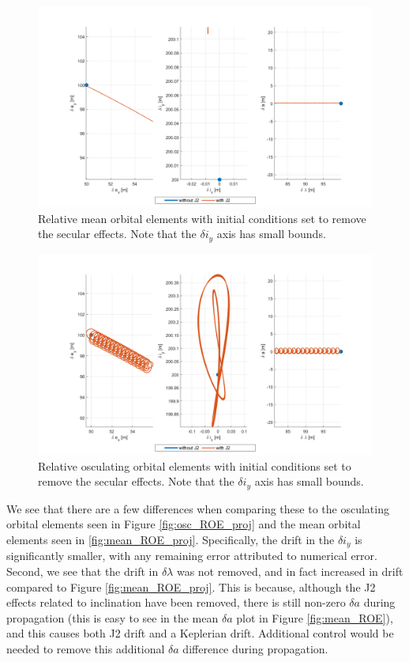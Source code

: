 \begin{figure}[H]
    \centering
    \includegraphics[width=0.8\linewidth]{sim/figures/PS4/ROE_projections_mean_no_drift_SV2.png}
    \caption{Relative mean orbital elements with initial conditions set to remove the secular effects. Note that the $\delta i_y$ axis has small bounds.}
    \label{fig:rel_roe_no_drift_mean}
\end{figure}

\begin{figure}[H]
    \centering
    \includegraphics[width=0.8\linewidth]{sim/figures/PS4/ROE_projections_osc_no_drift_SV2.png}
    \caption{Relative osculating orbital elements with initial conditions set to remove the secular effects. Note that the $\delta i_y$ axis has small bounds.}
    \label{fig:rel_roe_no_drift_osc}
\end{figure}

We see that there are a few differences when comparing these to the osculating orbital elements seen in Figure \ref{fig:osc_ROE_proj} and the mean orbital elements seen in \ref{fig:mean_ROE_proj}. Specifically, the drift in the $\delta i_y$ is significantly smaller, with any remaining error attributed to numerical error. Second, we see that the drift in $\delta \lambda$ was not removed, and in fact increased in drift compared to Figure \ref{fig:mean_ROE_proj}. This is because, although the J2 effects related to inclination have been removed, there is still non-zero $\delta a$ during propagation (this is easy to see in the mean $\delta a$ plot in Figure \ref{fig:mean_ROE}), and this causes both J2 drift and a Keplerian drift. Additional control would be needed to remove this additional $\delta a$ difference during propagation.

